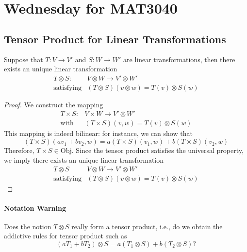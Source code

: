 
\section{Wednesday for MAT3040}
\subsection{Tensor Product for Linear Transformations}

\begin{proposition}
Suppose that $T:V\to V'$ and $S:W\to W'$ are linear transformations, then there exists an unique linear transformation 
\[
\begin{array}{ll}
T\otimes S:&V\otimes W\to V'\otimes W'\\
\text{satisfying}&(T\otimes S)(v\otimes w) = T(v)\otimes S(w)
\end{array}
\]
\end{proposition}

\begin{proof}
We construct the mapping
\[
\begin{array}{ll}
T\times S:&V\times W\to V'\otimes W'\\
\text{with}&(T\times S)(v,w) = T(v)\otimes S(w)
\end{array}
\]
This mapping is indeed bilinear: for instance, we can show that 
\[
(T\times S)(av_1+bv_2,w) = a(T\times S)(v_1,w)+b(T\times S)(v_2,w)
\]
Therefore, $T\times S\in\text{Obj}$. Since the tensor product satisfies the universal property, we imply there exists an unique linear transformation
\[
\begin{array}{ll}
T\otimes S&V\otimes W\to V'\otimes W'\\
\text{satisfying}&(T\otimes S)(v\otimes w)=T(v)\otimes S(w)
\end{array}
\]


\end{proof}
\paragraph{Notation Warning}
Does the notion $T\otimes S$ really form a tensor product, i.e., do we obtain the addictive rules for tensor product such as 
\[
(aT_1+bT_2)\otimes S = a(T_1\otimes S)+b(T_2\otimes S)?
\]


